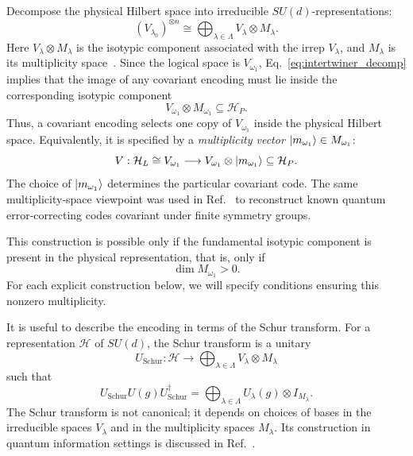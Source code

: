 \documentclass[10pt,twocolumn,superscriptaddress,aps,amsmath,amssymb,citeautoscript,floatfix,prx,longbibliography]{revtex4-2}
\theoremstyle{plain}
\theoremstyle{plain}
\theoremstyle{plain}
\theoremstyle{plain}
\theoremstyle{plain}
\theoremstyle{plain}
\begin{document}
Decompose the physical Hilbert space into irreducible $SU(d)$-representations:
\begin{equation}\label{eq:isotipic_decomp}
    (V_{\lambda_0})^{\otimes n}
    \cong
    \bigoplus_{\lambda\in\Lambda}
    V_\lambda\otimes M_\lambda .
\end{equation}
Here $V_\lambda\otimes M_\lambda$ is the isotypic component associated with the irrep $V_\lambda$, and $M_\lambda$ is its multiplicity space~\cite{Kong2022}. Since the logical space is $V_{\omega_1}$, Eq.~\eqref{eq:intertwiner_decomp} implies that the image of any covariant encoding must lie inside the corresponding isotypic component
$$
    V_{\omega_1}\otimes M_{\omega_1}
    \subseteq
    \mathcal H_P .
$$
Thus, a covariant encoding selects one copy of $V_{\omega_1}$ inside the physical Hilbert space. Equivalently, it is specified by a \textit{multiplicity vector} $\ket{m_{\omega_1}}\in M_{\omega_1}$:
\begin{equation}\label{eq:mult_vec_enc}
    V:
    \mathcal H_L
    \cong
    V_{\omega_1}
    \longrightarrow
    V_{\omega_1}\otimes\ket{m_{\omega_1}}
    \subseteq
    \mathcal H_P .
\end{equation}
The choice of $\ket{m_{\omega_1}}$ determines the particular covariant code. The same multiplicity-space viewpoint was used in Ref.~\cite{Denys2024} to reconstruct known quantum error-correcting codes covariant under finite symmetry groups.

This construction is possible only if the fundamental isotypic component is present in the physical representation, that is, only if
$$
    \dim M_{\omega_1}>0 .
$$
For each explicit construction below, we will specify conditions ensuring this nonzero multiplicity.

It is useful to describe the encoding in terms of the Schur transform. For a representation $\mathcal H$ of $SU(d)$, the Schur transform is a unitary
$$
    U_{\mathrm{Schur}}:
    \mathcal H
    \longrightarrow
    \bigoplus_{\lambda\in\Lambda}
    V_\lambda\otimes M_\lambda
$$
such that
\begin{equation}\label{eq:schur_transform}
    U_{\mathrm{Schur}}
    U(g)
    U_{\mathrm{Schur}}^\dagger
    =
    \bigoplus_{\lambda\in\Lambda}
    U_\lambda(g)\otimes I_{M_\lambda}.
\end{equation}
The Schur transform is not canonical; it depends on choices of bases in the irreducible spaces $V_\lambda$ and in the multiplicity spaces $M_\lambda$. Its construction in quantum information settings is discussed in Ref.~\cite{Bacon2006}.
\end{document}
